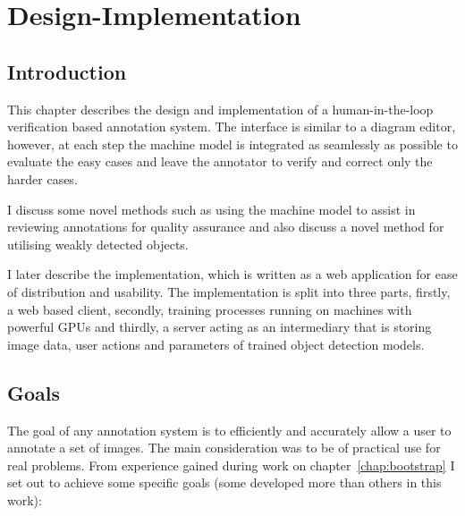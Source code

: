 \chapter{Design-Implementation}
\label{chap:design} 

\section{Introduction}

This chapter describes the design and implementation of a human-in-the-loop verification based annotation system. The interface is similar to a diagram editor, however, at each step the machine model is integrated as seamlessly as possible to evaluate the easy cases and leave the annotator to verify and correct only the harder cases. 

I discuss some novel methods such as using the machine model to assist in reviewing annotations for quality assurance and also discuss a novel method for utilising weakly detected objects.

I later describe the implementation, which is written as a web application for ease of distribution and usability. The implementation is split into three parts, firstly, a web based client, secondly, training processes running on machines with powerful \gls{GPU}s and thirdly, a server acting as an intermediary that is storing image data, user actions and parameters of trained object detection models.

\section {Goals}

The goal of any annotation system is to efficiently and accurately allow a user to annotate a set of images. The main consideration was to be of practical use for real problems. From experience gained during work on chapter~\ref{chap:bootstrap} I set out to achieve some specific goals (some developed more than others in this work):

